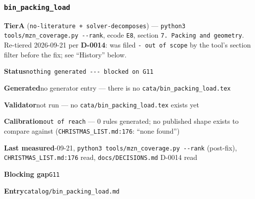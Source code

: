 \documentclass[10pt,a4paper]{article}
\newcommand{\entryfield}[2]{{\raggedright\textbf{#1}\quad #2\par}}
\begin{document}
\subsubsection*{\texttt{bin\_\allowbreak{}packing\_\allowbreak{}load}}
\label{entry:bin-packing-load}
\entryfield{Tier}{\textbf{A} (\texttt{no-\allowbreak{}literature + solver-\allowbreak{}decomposes}) --- \texttt{python3 tools/\allowbreak{}mzn\_\allowbreak{}coverage.\allowbreak{}py -\allowbreak{}-\allowbreak{}rank}, ecode \texttt{E8}, section \texttt{7. Packing and geometry}. Re-tiered 2026-09-21 per \textbf{D-0014}: was filed \texttt{- out of scope} by the tool's section filter before the fix; see ``History'' below.}
\entryfield{Status}{\texttt{nothing generated -\allowbreak{}-\allowbreak{}-\allowbreak{} blocked on G11}}
\entryfield{Generated}{no generator entry --- there is no \texttt{cata/\allowbreak{}bin\_\allowbreak{}packing\_\allowbreak{}load.\allowbreak{}tex}}
\entryfield{Validator}{not run --- no \texttt{cata/\allowbreak{}bin\_\allowbreak{}packing\_\allowbreak{}load.\allowbreak{}tex} exists yet}
\entryfield{Calibration}{\texttt{out of reach} --- 0 rules generated; no published shape exists to compare against (\texttt{CHRISTMAS\_LIST.md:176}: ``none found'')}
\entryfield{Last measured}{2026-09-21, \texttt{python3 tools/\allowbreak{}mzn\_\allowbreak{}coverage.\allowbreak{}py -\allowbreak{}-\allowbreak{}rank} (post-fix), \texttt{CHRISTMAS\_LIST.md:176} read, \texttt{docs/DECISIONS.md} D-0014 read}
\entryfield{Blocking gap}{\texttt{G11}}
\entryfield{Entry}{\texttt{catalog/bin\_packing\_load.md}}
\end{document}
